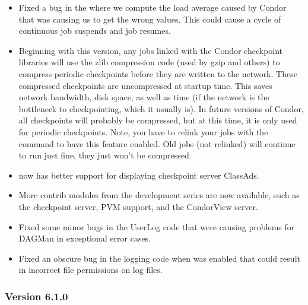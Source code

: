 \begin{itemize}

\item Fixed a bug in the  where we compute the load
average caused by Condor that was causing us to get the wrong values.
This could cause a cycle of continuous job suspends and job resumes.

\item Beginning with this version, any jobs linked with the Condor
checkpoint libraries will use the zlib compression code (used by gzip
and others) to compress periodic checkpoints before they are written
to the network.  
These compressed checkpoints are uncompressed at startup time.  
This saves network bandwidth, disk space, as well as time (if the
network is the bottleneck to checkpointing, which it usually is). 
In future versions of Condor, all checkpoints will probably be
compressed, but at this time, it is only used for periodic
checkpoints.  
Note, you have to relink your jobs with the  command
to have this feature enabled.
Old jobs (not relinked) will continue to run just fine, they just
won't be compressed.

\item {} now has better support for displaying checkpoint
server ClassAds. 

\item More contrib modules from the development series are now
available, such as the checkpoint server, PVM support, and the
CondorView server.  

\item Fixed some minor bugs in the UserLog code that were causing
problems for DAGMan in exceptional error cases.

\item Fixed an obscure bug in the logging code when  was
enabled that could result in incorrect file permissions on log files. 

\end{itemize}

\subsubsection{\label{sec:New-6-1-0}Version 6.1.0}

